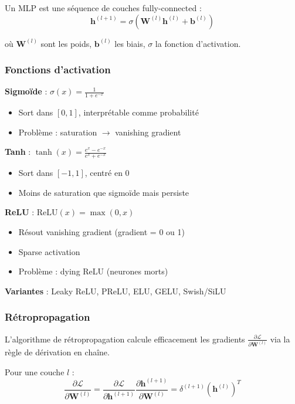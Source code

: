 Un MLP est une séquence de couches fully-connected :
\[
\mathbf{h}^{(l+1)} = \sigma\left(\mathbf{W}^{(l)}\mathbf{h}^{(l)} + \mathbf{b}^{(l)}\right)
\]

où $\mathbf{W}^{(l)}$ sont les poids, $\mathbf{b}^{(l)}$ les biais, $\sigma$ la fonction d'activation.

\subsubsection{Fonctions d'activation}

\textbf{Sigmoïde} : $\sigma(x) = \frac{1}{1 + e^{-x}}$
\begin{itemize}
    \item Sort dans $[0, 1]$, interprétable comme probabilité
    \item Problème : saturation $\rightarrow$ vanishing gradient
\end{itemize}

\textbf{Tanh} : $\tanh(x) = \frac{e^x - e^{-x}}{e^x + e^{-x}}$
\begin{itemize}
    \item Sort dans $[-1, 1]$, centré en 0
    \item Moins de saturation que sigmoïde mais persiste
\end{itemize}

\textbf{ReLU} : $\text{ReLU}(x) = \max(0, x)$
\begin{itemize}
    \item Résout vanishing gradient (gradient = 0 ou 1)
    \item Sparse activation
    \item Problème : dying ReLU (neurones morts)
\end{itemize}

\textbf{Variantes} : Leaky ReLU, PReLU, ELU, GELU, Swish/SiLU

\subsubsection{Rétropropagation}

L'algorithme de rétropropagation calcule efficacement les gradients $\frac{\partial \mathcal{L}}{\partial \mathbf{W}^{(l)}}$ via la règle de dérivation en chaîne.

Pour une couche $l$ :
\[
\frac{\partial \mathcal{L}}{\partial \mathbf{W}^{(l)}} = \frac{\partial \mathcal{L}}{\partial \mathbf{h}^{(l+1)}} \frac{\partial \mathbf{h}^{(l+1)}}{\partial \mathbf{W}^{(l)}} = \delta^{(l+1)} (\mathbf{h}^{(l)})^T
\]

